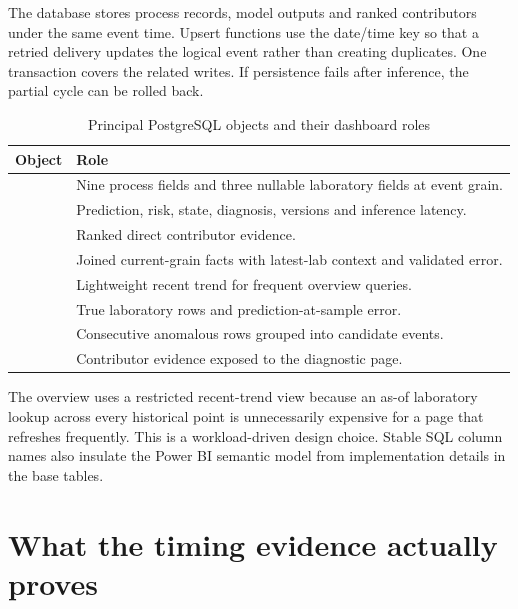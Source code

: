 The database stores process records, model outputs and ranked contributors under the same event time. Upsert functions use the date/time key so that a retried delivery updates the logical event rather than creating duplicates. One transaction covers the related writes. If persistence fails after inference, the partial cycle can be rolled back.

\begin{table}[htbp]
\centering\small
\caption{Principal PostgreSQL objects and their dashboard roles}
\label{tab:dbobjects}
\begin{tabularx}{\textwidth}{@{}p{}Y@{}}
\toprule
Object & Role \\
\midrule
{} & Nine process fields and three nullable laboratory fields at event grain. \\
 & Prediction, risk, state, diagnosis, versions and inference latency. \\
 & Ranked direct contributor evidence. \\
 & Joined current-grain facts with latest-lab context and validated error. \\
 & Lightweight recent trend for frequent overview queries. \\
 & True laboratory rows and prediction-at-sample error. \\
 & Consecutive anomalous rows grouped into candidate events. \\
 & Contributor evidence exposed to the diagnostic page. \\
\bottomrule
\end{tabularx}
\end{table}

The overview uses a restricted recent-trend view because an as-of laboratory lookup across every historical point is unnecessarily expensive for a page that refreshes frequently. This is a workload-driven design choice. Stable SQL column names also insulate the Power BI semantic model from implementation details in the base tables.

\FloatBarrier

\section{What the timing evidence actually proves}

